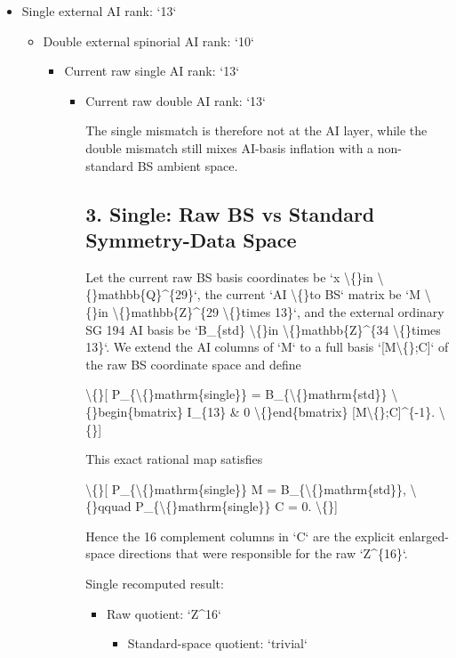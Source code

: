 \documentclass[11pt]{article}
\begin{document}
\begin{itemize}
\item Single external AI rank: `13`
\begin{itemize}
\item Double external spinorial AI rank: `10`
\begin{itemize}
\item Current raw single AI rank: `13`
\begin{itemize}
\item Current raw double AI rank: `13`

The single mismatch is therefore not at the AI layer, while the double mismatch still mixes AI-basis inflation with a non-standard BS ambient space.

\subsection*{3. Single: Raw BS vs Standard Symmetry-Data Space}

Let the current raw BS basis coordinates be `x \textbackslash\{\}in \textbackslash\{\}mathbb\{Q\}\textasciicircum{}\{29\}`, the current `AI \textbackslash\{\}to BS` matrix be `M \textbackslash\{\}in \textbackslash\{\}mathbb\{Z\}\textasciicircum{}\{29 \textbackslash\{\}times 13\}`, and the external ordinary SG 194 AI basis be `B\_\{std\} \textbackslash\{\}in \textbackslash\{\}mathbb\{Z\}\textasciicircum{}\{34 \textbackslash\{\}times 13\}`. We extend the AI columns of `M` to a full basis `[M\textbackslash\{\};C]` of the raw BS coordinate space and define

\textbackslash\{\}[
P\_\{\textbackslash\{\}mathrm\{single\}\} = B\_\{\textbackslash\{\}mathrm\{std\}\}
\textbackslash\{\}begin\{bmatrix\} I\_\{13\} \& 0 \textbackslash\{\}end\{bmatrix\}
[M\textbackslash\{\};C]\textasciicircum{}\{-1\}.
\textbackslash\{\}]

This exact rational map satisfies

\textbackslash\{\}[
P\_\{\textbackslash\{\}mathrm\{single\}\} M = B\_\{\textbackslash\{\}mathrm\{std\}\}, \textbackslash\{\}qquad
P\_\{\textbackslash\{\}mathrm\{single\}\} C = 0.
\textbackslash\{\}]

Hence the 16 complement columns in `C` are the explicit enlarged-space directions that were responsible for the raw `Z\textasciicircum{}\{16\}`.

Single recomputed result:

\begin{itemize}
\item Raw quotient: `Z\textasciicircum{}16`
\begin{itemize}
\item Standard-space quotient: `trivial`


\end{itemize}
\end{itemize}
\end{itemize}
\end{itemize}
\end{itemize}
\end{itemize}
\end{document}
